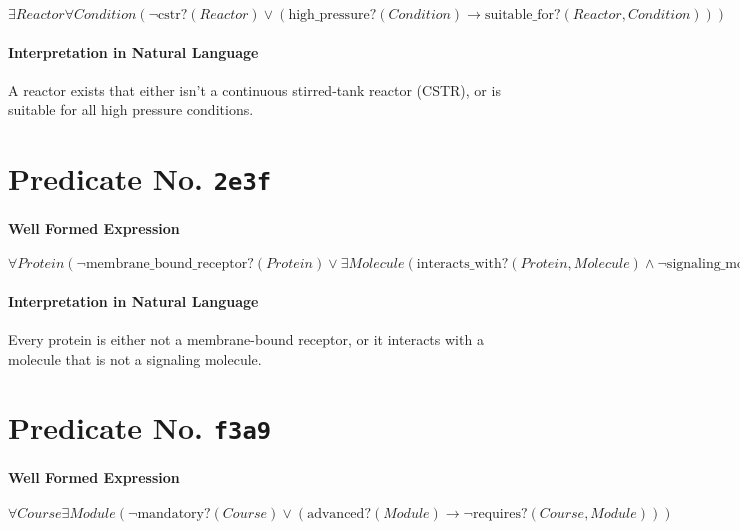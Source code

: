 \documentclass[11pt]{article}
\begin{document}
\(\exists \mathit{Reactor} \forall \mathit{Condition} (\neg \mathrm{cstr?}(\mathit{Reactor}) \lor (\mathrm{high\_pressure?}(\mathit{Condition}) \rightarrow \mathrm{suitable\_for?}(\mathit{Reactor}, \mathit{Condition})))\)

\paragraph*{Interpretation in Natural Language}
\label{sec:org2b78ac0}

A reactor exists that either isn't a continuous stirred-tank reactor (CSTR), or is suitable for all high pressure conditions.



\section{Predicate No. \texttt{2e3f}}
\label{sec:org8f3fcc9}

\paragraph*{Well Formed Expression}
\label{sec:org567fb99}

\(\forall \mathit{Protein} (\neg \mathrm{membrane\_bound\_receptor?}(\mathit{Protein}) \lor \exists \mathit{Molecule} (\mathrm{interacts\_with?}(\mathit{Protein}, \mathit{Molecule}) \land \neg \mathrm{signaling\_molecule?}(\mathit{Molecule})))\)

\paragraph*{Interpretation in Natural Language}
\label{sec:org8ad00d2}

Every protein is either not a membrane-bound receptor, or it interacts with a molecule that is not a signaling molecule.



\section{Predicate No. \texttt{f3a9}}
\label{sec:org22b7b99}

\paragraph*{Well Formed Expression}
\label{sec:org0eaa212}

\(\forall \mathit{Course} \exists \mathit{Module} (\neg \mathrm{mandatory?}(\mathit{Course}) \lor (\mathrm{advanced?}(\mathit{Module}) \rightarrow \neg \mathrm{requires?}(\mathit{Course}, \mathit{Module})))\)
\end{document}
